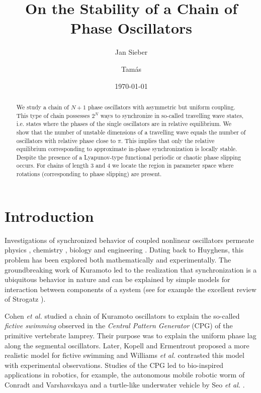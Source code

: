 \documentclass[aps,pre,twocolumn,a4paper,showkeys,showpacs]{revtex4}\usepackage{color}
\theoremstyle{plain}
\theoremstyle{plain}
\begin{document}
\title{On the Stability of a Chain of Phase Oscillators}
\date{\today}
\author{Jan Sieber}
\author{Tam{\'a}s }

\begin{abstract}
We study a chain of $N+1$ phase oscillators with asymmetric but  uniform
coupling. This type of chain possesses $2^{N}$ ways to  synchronize in
so-called travelling wave states, i.e. states where  the phases of the single
oscillators are in relative equilibrium. We  show that the number of unstable
dimensions of a travelling wave  equals the number of oscillators with
relative phase close to  $\pi$. This implies that only the relative
equilibrium corresponding  to approximate in-phase synchronization is locally
stable. Despite  the presence of a Lyapunov-type functional periodic or
chaotic phase  slipping occurs. For chains of length $3$ and $4$ we locate
the  region in parameter space where rotations (corresponding to phase
slipping) are present.

\end{abstract}

\maketitle

\section{Introduction}

Investigations of synchronized behavior of coupled nonlinear oscillators
permeate physics \cite{strogatz1988csl,kuramoto1985cdo}, chemistry
\cite{bareli1985scc,crowley1989ets}, biology \cite{kawato1980tcn} and
engineering \cite{ijspeert2001ccp}. Dating back to Huyghens, this problem has
been explored both mathematically and experimentally. The groundbreaking work
of Kuramoto \cite{kuramoto2003cow} led to the realization that synchronization
is a ubiquitous behavior in nature and can be explained by simple models for
interaction between components of a system (see for example the excellent
review of Strogatz \cite{strogatz2000kce}).

Cohen \emph{et al.} \cite{cohen1982ncs} studied a chain of Kuramoto
oscillators to explain the so-called \textit{fictive swimming} observed in the
\textit{Central Pattern Generator} (CPG) of the primitive vertebrate lamprey.
Their purpose was to explain the uniform phase lag along the segmental
oscillators. Later, Kopell and Ermentrout \cite{kopell1988coa} proposed a more
realistic model for fictive swimming and Williams \emph{et al.}
\cite{williams1990fcn} contrasted this model with experimental observations.
Studies of the CPG led to bio-inspired applications in robotics, for example,
the autonomous mobile robotic worm of Conradt and Varshavskaya
\cite{conradt2003dcp} and a turtle-like underwater vehicle by Seo \emph{et
al.} \cite{seo2008cbc}.
\end{document}
